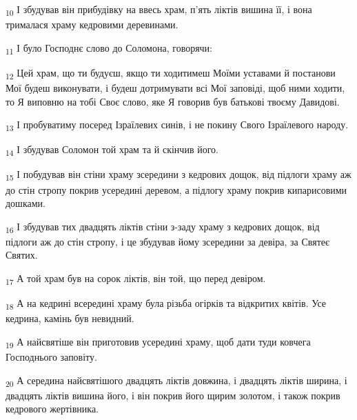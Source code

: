 \begin{tcolorbox}
\textsubscript{10} І збудував він прибудівку на ввесь храм, п'ять ліктів вишина її, і вона трималася храму кедровими деревинами.
\end{tcolorbox}
\begin{tcolorbox}
\textsubscript{11} І було Господнє слово до Соломона, говорячи:
\end{tcolorbox}
\begin{tcolorbox}
\textsubscript{12} Цей храм, що ти будуєш, якщо ти ходитимеш Моїми уставами й постанови Мої будеш виконувати, і будеш дотримувати всі Мої заповіді, щоб ними ходити, то Я виповню на тобі Своє слово, яке Я говорив був батькові твоєму Давидові.
\end{tcolorbox}
\begin{tcolorbox}
\textsubscript{13} І пробуватиму посеред Ізраїлевих синів, і не покину Свого Ізраїлевого народу.
\end{tcolorbox}
\begin{tcolorbox}
\textsubscript{14} І збудував Соломон той храм та й скінчив його.
\end{tcolorbox}
\begin{tcolorbox}
\textsubscript{15} І побудував він стіни храму зсередини з кедрових дощок, від підлоги храму аж до стін стропу покрив усередині деревом, а підлогу храму покрив кипарисовими дошками.
\end{tcolorbox}
\begin{tcolorbox}
\textsubscript{16} І збудував тих двадцять ліктів стіни з-заду храму з кедрових дощок, від підлоги аж до стін стропу, і це збудував йому зсередини за девіра, за Святеє Святих.
\end{tcolorbox}
\begin{tcolorbox}
\textsubscript{17} А той храм був на сорок ліктів, він той, що перед девіром.
\end{tcolorbox}
\begin{tcolorbox}
\textsubscript{18} А на кедрині всередині храму була різьба огірків та відкритих квітів. Усе кедрина, камінь був невидний.
\end{tcolorbox}
\begin{tcolorbox}
\textsubscript{19} А найсвятіше він приготовив усередині храму, щоб дати туди ковчега Господнього заповіту.
\end{tcolorbox}
\begin{tcolorbox}
\textsubscript{20} А середина найсвятішого двадцять ліктів довжина, і двадцять ліктів ширина, і двадцять ліктів вишина його, і він покрив його щирим золотом, і також покрив кедрового жертівника.
\end{tcolorbox}
